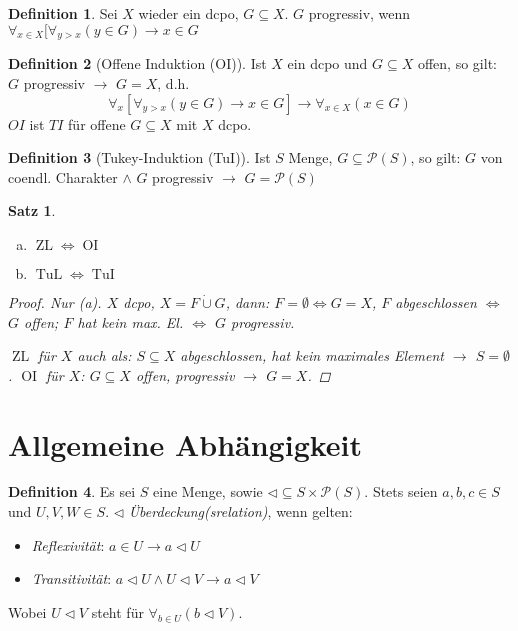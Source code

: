 \documentclass[headsepline=true,DIV=11]{scrartcl}
\newtheorem{theorem}{Satz}
\theoremstyle{definition}
\newtheorem*{definition}{Definition}
\newcommand{\ZL}{\operatorname{ZL}}
\newcommand{\OI}{\operatorname{OI}}
\newcommand{\TuL}{\operatorname{TuL}}
\newcommand{\TuI}{\operatorname{TuI}}
\begin{document}
\begin{definition}
	Sei $X$ wieder ein dcpo, $G\subseteq X$.
	$G$ progressiv, wenn $\forall_{x\in X} [\forall_{y>x}(y\in G)\to x\in G$
\end{definition}

\begin{definition}[Offene Induktion (OI)]
	Ist $X$ ein dcpo und $G\subseteq X$ offen, so gilt: $G$ progressiv $\to$ $G=X$, d.h.
	\[\forall_x[\forall_{y>x}(y\in G)\to x\in G]\to \forall_{x\in X}(x\in G)\]
	$OI$ ist $TI$ für offene $G\subseteq X$ mit $X$ dcpo.
\end{definition}

\begin{definition}[Tukey-Induktion (TuI)]
	Ist $S$ Menge, $G\subseteq\mathcal P(S)$, so gilt:
	$G$ von coendl. Charakter $\land$ $G$ progressiv $\to$ $G=\mathcal P(S)$
\end{definition}

\begin{theorem}
	\begin{enumerate}[(a)]
		\item $\ZL \iff \OI$
		\item $\TuL \iff \TuI$
	\end{enumerate}
	\begin{proof}
		Nur (a).
		$X$ dcpo, $X=F\dot\cup G$, dann: $F=\emptyset\iff G=X$, 
		$F$ abgeschlossen $\iff$ $G$ offen;
		$F$ hat kein max. El. $\iff$ $G$ progressiv.
		
		$\ZL$ für $X$ auch als: $S\subseteq X$ abgeschlossen, hat kein maximales Element $\to$ $S=\emptyset$.
		$\OI$ für $X$: $G\subseteq X$ offen, progressiv $\to$ $G=X$.
	\end{proof}
\end{theorem}

\section{Allgemeine Abhängigkeit}

\begin{definition}
	Es sei $S$ eine Menge, sowie $\lhd\subseteq S\times \mathcal P(S)$.
	Stets seien $a, b, c\in S$ und $U, V, W\in S$.
	$\lhd$ {\em Überdeckung(srelation)}, wenn gelten:
	\begin{itemize}
		\item {\em Reflexivität}: $a\in U\to a\lhd U$
		\item {\em Transitivität}: $ a\lhd U \land U\lhd V \to a\lhd V$
	\end{itemize}
	Wobei $U\lhd V$ steht für $\forall_{b\in U}(b\lhd V)$. %
	
\end{definition}
\end{document}
